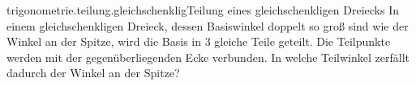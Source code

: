 \begin{exercise}{trigonometrie.teilung.gleichschenklig}{Teilung eines gleichschenkligen Dreiecks}
  \ifproblem\problem
    In einem gleichschenkligen Dreieck, dessen Basiswinkel
    doppelt so groß sind wie der Winkel an der Spitze, wird
    die Basis in 3 gleiche Teile geteilt. Die Teilpunkte
    werden mit der gegenüberliegenden Ecke verbunden. In
    welche Teilwinkel zerfällt dadurch der Winkel an der
    Spitze?
  \fi
\end{exercise}
